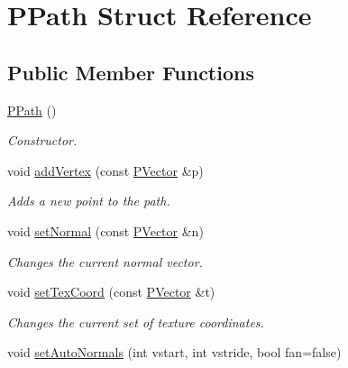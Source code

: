 \hypertarget{structPPath}{\section{\-P\-Path \-Struct \-Reference}
\label{structPPath}
}
\subsection*{\-Public \-Member \-Functions}
\begin{DoxyCompactItemize}
\item 
\hypertarget{structPPath_af5405f463517c45459e647cd1f834798}{\hyperlink{structPPath_af5405f463517c45459e647cd1f834798}{\-P\-Path} ()}\label{structPPath_af5405f463517c45459e647cd1f834798}

\begin{DoxyCompactList}\small\item\em \-Constructor. \end{DoxyCompactList}\item 
\hypertarget{structPPath_a929f642a8a8bf341f0070643c0ff757b}{void \hyperlink{structPPath_a929f642a8a8bf341f0070643c0ff757b}{add\-Vertex} (const \hyperlink{classcprocessing_1_1PVector}{\-P\-Vector} \&p)}\label{structPPath_a929f642a8a8bf341f0070643c0ff757b}

\begin{DoxyCompactList}\small\item\em \-Adds a new point to the path. \end{DoxyCompactList}\item 
\hypertarget{structPPath_a3cc19cb2b196178f4572f3f7f4efb90b}{void \hyperlink{structPPath_a3cc19cb2b196178f4572f3f7f4efb90b}{set\-Normal} (const \hyperlink{classcprocessing_1_1PVector}{\-P\-Vector} \&n)}\label{structPPath_a3cc19cb2b196178f4572f3f7f4efb90b}

\begin{DoxyCompactList}\small\item\em \-Changes the current normal vector. \end{DoxyCompactList}\item 
\hypertarget{structPPath_aae2a000ee4997dd8ec357d726f3181c1}{void \hyperlink{structPPath_aae2a000ee4997dd8ec357d726f3181c1}{set\-Tex\-Coord} (const \hyperlink{classcprocessing_1_1PVector}{\-P\-Vector} \&t)}\label{structPPath_aae2a000ee4997dd8ec357d726f3181c1}

\begin{DoxyCompactList}\small\item\em \-Changes the current set of texture coordinates. \end{DoxyCompactList}\item 
void \hyperlink{structPPath_a9564ae60ad10d168e5882f12b33c0170}{set\-Auto\-Normals} (int vstart, int vstride, bool fan=false)
\end{DoxyCompactItemize}
